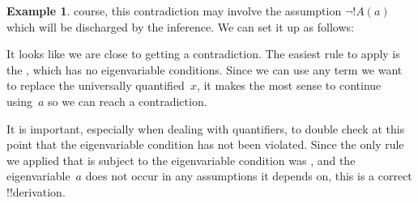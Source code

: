 \documentclass[10pt,a4paper]{article}
\theoremstyle{plain}
\theoremstyle{definition}
\newtheorem{ex}[thm]{Example}
\theoremstyle{remark}
\providecommand{\AxiomC}[1]{}
\providecommand{\UnaryInfC}[1]{}
\providecommand{\BinaryInfC}[1]{}
\providecommand{\RightLabel}[1]{}
\newenvironment{prooftree}{}{}
\providecommand{\lif}{\mathbin{\rightarrow}}
\providecommand{\lforall}{\mathord{\forall}}
\providecommand{\lexists}{\mathord{\exists}}
\providecommand{\lfalse}{\bot}
\providecommand{\Elim}[1]{}
\providecommand{\Intro}[1]{}
\providecommand{\Discharge}{\mathrm{Dis}}
\providecommand{\Intro}{\mathrm{I}}
\begin{document}
\begin{ex}
course, this contradiction may involve the assumption $\lnot !A(a)$
which will be discharged by the \Elim{\lexists} inference. We can set it
up as follows:
\begin{prooftree}
\AxiomC{$\Discharge{\lexists[x][\lnot !A(x)]}{1}$}
\AxiomC{$\Discharge{\lnot !A(a)}{2}, \Discharge{\lforall[x][!A(x)]}{3}$}
\DeduceC{$\lfalse$}
\DischargeRule{\Intro{\lnot}}{3}
\UnaryInfC{$\lnot \lforall[x][!A(x)]$}
\DischargeRule{\Elim{\lexists}}{2}
\BinaryInfC{$\lnot \lforall[x][!A(x)]$}
\DischargeRule{\Intro{\lif}}{1}
\UnaryInfC{$\lexists[x][\lnot !A(x)]\lif \lnot \lforall[x][!A(x)]$}
\end{prooftree}
It looks like we are close to getting a contradiction. The easiest
rule to apply is the \Elim{\lforall}, which has no eigenvariable
conditions. Since we can use any term we want to replace the
universally quantified~$x$, it makes the most sense to continue
using~$a$ so we can reach a contradiction.
\begin{prooftree}
\AxiomC{$\Discharge{\lexists[x][\lnot !A(x)]}{1}$}
\AxiomC{$\Discharge{\lnot !A(a)}{2}$}
\AxiomC{$\Discharge{\lforall[x][!A(x)]}{3}$}
\RightLabel{\Elim{\lforall}}
\UnaryInfC{$!A(a)$}
\RightLabel{\Elim{\lnot}}
\BinaryInfC{$\lfalse$}
\DischargeRule{\Intro{\lnot}}{3}
\UnaryInfC{$\lnot \lforall[x][!A(x)]$}
\DischargeRule{\Elim{\lexists}}{2}
\BinaryInfC{$\lnot \lforall[x][!A(x)]$}
\DischargeRule{\Intro{\lif}}{1}
\UnaryInfC{$\lexists[x][\lnot !A(x)]\lif \lnot \lforall[x][!A(x)]$}
\end{prooftree}

It is important, especially when dealing with quantifiers, to double
check at this point that the eigenvariable condition has not been
violated. Since the only rule we applied that is subject to the
eigenvariable condition was \Elim{\exists}, and the eigenvariable~$a$
does not occur in any assumptions it depends on, this is a
correct !!{derivation}.
\end{ex}
\end{document}

